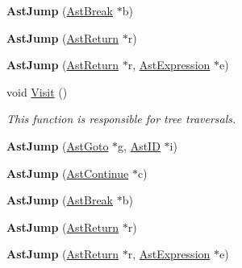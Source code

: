 \begin{DoxyCompactItemize}
\item 
\hypertarget{classAstJump_a8b9e461b6a974f01889e89728afc7014}{{\bfseries Ast\-Jump} (\hyperlink{classAstBreak}{Ast\-Break} $\ast$b)}\label{classAstJump_a8b9e461b6a974f01889e89728afc7014}

\item 
\hypertarget{classAstJump_a083525b758ad6e931aee5ac850592730}{{\bfseries Ast\-Jump} (\hyperlink{classAstReturn}{Ast\-Return} $\ast$r)}\label{classAstJump_a083525b758ad6e931aee5ac850592730}

\item 
\hypertarget{classAstJump_ad80d35d23849aa369fef153fef4bb99e}{{\bfseries Ast\-Jump} (\hyperlink{classAstReturn}{Ast\-Return} $\ast$r, \hyperlink{classAstExpression}{Ast\-Expression} $\ast$e)}\label{classAstJump_ad80d35d23849aa369fef153fef4bb99e}

\item 
void \hyperlink{classAstJump_aca65cbe034ffdb439f6e3c73e40550ae}{Visit} ()
\begin{DoxyCompactList}\small\item\em This function is responsible for tree traversals. \end{DoxyCompactList}\item 
\hypertarget{classAstJump_a83a4aa905d84f3602374029976d99412}{{\bfseries Ast\-Jump} (\hyperlink{classAstGoto}{Ast\-Goto} $\ast$g, \hyperlink{classAstID}{Ast\-I\-D} $\ast$i)}\label{classAstJump_a83a4aa905d84f3602374029976d99412}

\item 
\hypertarget{classAstJump_a945a1bdc268bfa7f1fdd9f4d39bdef1a}{{\bfseries Ast\-Jump} (\hyperlink{classAstContinue}{Ast\-Continue} $\ast$c)}\label{classAstJump_a945a1bdc268bfa7f1fdd9f4d39bdef1a}

\item 
\hypertarget{classAstJump_a8b9e461b6a974f01889e89728afc7014}{{\bfseries Ast\-Jump} (\hyperlink{classAstBreak}{Ast\-Break} $\ast$b)}\label{classAstJump_a8b9e461b6a974f01889e89728afc7014}

\item 
\hypertarget{classAstJump_a083525b758ad6e931aee5ac850592730}{{\bfseries Ast\-Jump} (\hyperlink{classAstReturn}{Ast\-Return} $\ast$r)}\label{classAstJump_a083525b758ad6e931aee5ac850592730}

\item 
\hypertarget{classAstJump_ad80d35d23849aa369fef153fef4bb99e}{{\bfseries Ast\-Jump} (\hyperlink{classAstReturn}{Ast\-Return} $\ast$r, \hyperlink{classAstExpression}{Ast\-Expression} $\ast$e)}\label{classAstJump_ad80d35d23849aa369fef153fef4bb99e}


\end{DoxyCompactItemize}
